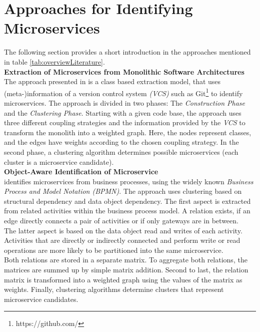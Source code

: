 \clearpage





\section{Approaches for Identifying Microservices}
\label{sec:stateOfTheArt:approaches}
The following section provides a short introduction in the approaches mentioned in table \ref{tab:overviewLiterature}. \\

\noindent
\textbf{Extraction of Microservices from Monolithic Software Architectures   } \\
The approach presented in \cite{ExtractionMazlami} is a class based extraction model, that uses (meta-)information of a version control system \textit{(VCS)} such as Git\footnote{https://github.com/} to identify microservices. The approach is divided in two phases: The \textit{Construction Phase} and the \textit{Clustering Phase}.
Starting with a given code base, the approach uses three different coupling strategies and the information provided by the \textit{VCS} to transform the monolith into a weighted graph. Here, the nodes represent classes, and the edges have weights according to the chosen coupling strategy. In the second phase, a clustering algorithm determines possible microservices (each cluster is a microservice candidate). \\

\noindent
\textbf{Object-Aware Identification of Microservice  } \\
\cite{ObjectAwareAmiri} identifies microservices from business processes, using the widely known \textit{Business Process and Model Notation (BPMN)}. The approach uses clustering based on structural dependency and data object dependency. The first aspect is extracted from related activities within the business process model. A relation exists, if an edge directly connects a pair of activities or if only gateways are in between. \\
The latter aspect is based on the data object read and writes of each activity. Activities that are directly or indirectly connected and perform write or read operations are more likely to be partitioned into the same microservice. \\
Both relations are stored in a separate matrix. To aggregate both relations, the matrices are summed up by simple matrix addition. Second to last, the relation matrix is transformed into a weighted graph using the values of the matrix as weights. Finally, clustering algorithms determine clusters that represent microservice candidates.\\



